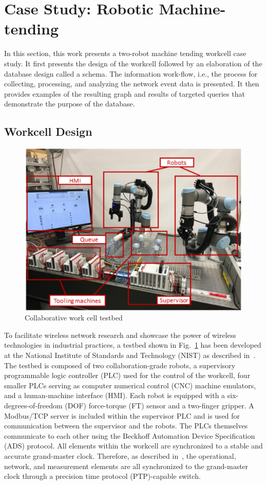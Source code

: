 \section{Case Study: Robotic Machine-tending}
In this section, this work presents a two-robot machine tending workcell case study.  It first presents the design of the workcell followed by an elaboration of the database design called a schema.  The information work-flow, i.e., the process for collecting, processing, and analyzing the network event data is presented.  It then provides examples of the resulting graph and results of targeted queries that demonstrate the purpose of the database. 
\subsection{Workcell Design}

\begin{figure}[!ht]
	\centering
	\includegraphics[width=\textwidth]{./chapter-gdb-appl/figures/cellShot}
	\caption{Collaborative work cell testbed}
	\label{gdbappl:fig::workcell}
\end{figure}

To facilitate wireless network research and showcase the power of wireless technologies in industrial practices, a testbed shown in Fig.~\ref{gdbappl:fig::workcell} has been developed at the National Institute of Standards and Technology (NIST) as described in~\cite{Liu2019vancouver}. The testbed is composed of two collaboration-grade robots, a supervisory programmable logic controller (PLC) used for the control of the workcell, four smaller PLCs serving as computer numerical control (CNC) machine emulators, and a human-machine interface (HMI).  Each robot is equipped with a six-degrees-of-freedom (DOF) force-torque (FT) sensor and a two-finger gripper. A Modbus/TCP server is included within the supervisor PLC and is used for communication between the supervisor and the robots.  The PLCs themselves communicate to each other using the Beckhoff Automation Device Specification (ADS) protocol. All elements within the workcell are synchronized to a stable and accurate grand-master clock. Therefore, as described in~\cite{Liu2019vancouver}, the operational, network, and measurement elements are all synchronized to the grand-master clock through a precision time protocol (PTP)-capable switch. 

